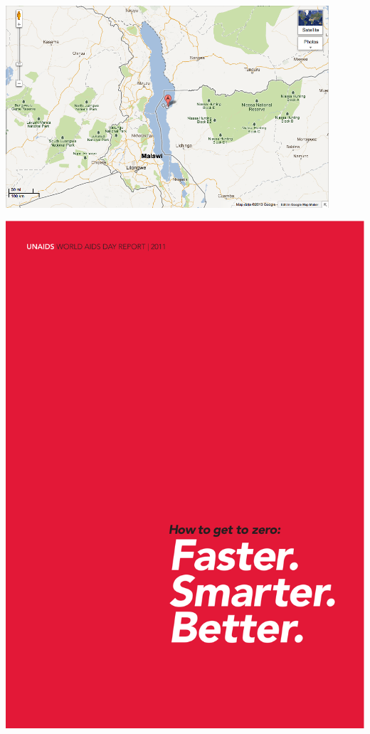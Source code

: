 \documentclass[aspectratio=169]{beamer}
\begin{document}
\begin{frame}

\begin{center}
\includegraphics[width = 0.90\textwidth]{figures/likoma_map}
\end{center}

\end{frame}
\begin{frame}

\begin{center}
\includegraphics[height = 0.9\textheight]{figures/unaids_report_cover_2011}
\end{center}


\end{frame}
\end{document}
